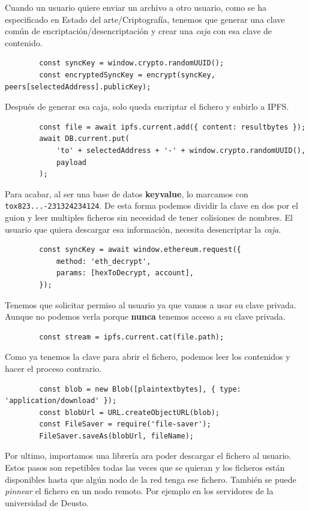 \begin{enumerate}
    Cuando un usuario quiere enviar un archivo a otro usuario, como se ha especificado en Estado del arte/Criptografía, tenemos que generar una clave común de encriptación/desencriptación y crear una \textit{caja} con esa clave de contenido.
    \begin{lstlisting}
        const syncKey = window.crypto.randomUUID();
        const encryptedSyncKey = encrypt(syncKey, peers[selectedAddress].publicKey);
    \end{lstlisting}
    Después de generar esa caja, solo queda encriptar el fichero y subirlo a IPFS.
    \begin{lstlisting}
        const file = await ipfs.current.add({ content: resultbytes });
        await DB.current.put(
			'to' + selectedAddress + '-' + window.crypto.randomUUID(),
			payload
		);
    \end{lstlisting}
    Para acabar, al ser una base de datos \textbf{keyvalue}, lo marcamos con \verb|tox823...-231324234124|. De esta forma podemos dividir la clave en dos por el guion y leer multiples ficheros sin necesidad de tener colisiones de nombres.
    El usuario que quiera descargar esa información, necesita desencriptar la \textit{caja}.
    \begin{lstlisting}
        const syncKey = await window.ethereum.request({
			method: 'eth_decrypt',
			params: [hexToDecrypt, account],
        });
    \end{lstlisting}
    Tenemos que solicitar permiso al usuario ya que vamos a usar su clave privada. Aunque no podemos verla porque \textbf{nunca} tenemos acceso a su clave privada.
    \begin{lstlisting}
        const stream = ipfs.current.cat(file.path);
    \end{lstlisting}
    Como ya tenemos la clave para abrir el fichero, podemos leer los contenidos y hacer el proceso contrario.
    \begin{lstlisting}
        const blob = new Blob([plaintextbytes], { type: 'application/download' });
        const blobUrl = URL.createObjectURL(blob);
        const FileSaver = require('file-saver');
        FileSaver.saveAs(blobUrl, fileName);
    \end{lstlisting}
    Por ultimo, importamos una librería ara poder descargar el fichero al usuario. 
    Estos pasos son repetibles todas las veces que se quieran y los ficheros están disponibles hasta que algún nodo de la red tenga ese fichero. También se puede \textit{pinnear} el fichero en un nodo remoto. Por ejemplo en los servidores de la universidad de Deusto.
\end{enumerate}
\newpage
\thispagestyle{empty}